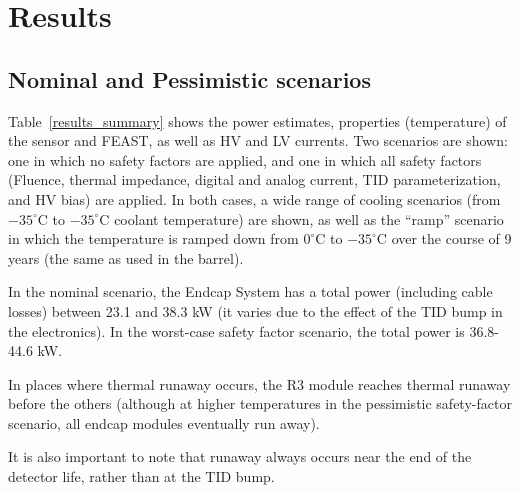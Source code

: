 
\section{Results}

\subsection{Nominal and Pessimistic scenarios}

Table~\ref{results_summary} shows the power estimates, properties (temperature) of the sensor and
FEAST, as well as HV and LV currents. Two scenarios are shown: one in which no safety factors are
applied, and one in which all safety factors (Fluence, thermal impedance, digital and analog current,
TID parameterization, and HV bias) are applied. In both cases, a wide range of cooling scenarios
(from $-35^\circ$C to $-35^\circ$C coolant temperature) are shown, as well as the ``ramp'' scenario
in which the temperature is ramped down from $0^\circ$C to $-35^\circ$C over the course of 9 years
(the same as used in the barrel).

In the nominal scenario, the Endcap System has a total power (including cable losses) between 23.1
and 38.3 kW (it varies due to the effect of the TID bump in the electronics).
In the worst-case safety factor scenario, the total power is 36.8-44.6 kW.

In places where thermal runaway occurs, the R3 module reaches thermal runaway before the others
(although at higher temperatures in the pessimistic safety-factor scenario, all endcap modules
eventually run away).

It is also important to note that runaway always occurs near the end of the detector life, rather than
at the TID bump.

\let\arraystretcha\arraystretch
\renewcommand\arraystretch{1.15} %

